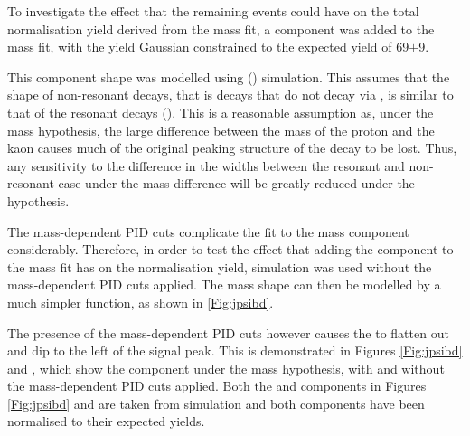 To investigate the effect that the remaining \Bd\to\jpsi\Kp\pim events could have on the total normalisation yield derived from the \Lbpijpsi mass fit, a \Bd\to\jpsi\Kp\pim component was added to the \Lbpijpsi mass fit, with the \Bd\to\jpsi\Kp\pim yield Gaussian constrained to the expected yield of 69$\pm$9.

This \Bd\to\jpsi\Kp\pim component shape was modelled using \Bd\to\jpsi\Kstarz(\to\Kp\pim) simulation. This assumes that the shape of non-resonant decays, that is \Bd\to\jpsi\Kp\pim decays that do not decay via \Kstarz, is similar to that of the resonant decays \Bd\to\jpsi\Kstarz(\to\Kp\pim). This is a reasonable assumption as, under the \jpsi\proton\pim mass hypothesis, the large difference between the mass of the proton and the kaon causes much of the original peaking structure of the decay to be lost. Thus, any sensitivity to the difference in the widths between the resonant and non-resonant case under the \jpsi\Kp\pim mass difference will be greatly reduced under the \jpsi\proton\pim hypothesis.

The mass-dependent PID cuts complicate the fit to the \BdToJPsiKst mass component considerably. Therefore, in order to test the effect that adding the \BdToJPsiKst component to the \Lbpijpsi mass fit has on the normalisation yield, simulation was used without the mass-dependent PID cuts applied. The mass shape can then be modelled by a much simpler function, as shown in \autoref{Fig:jpsibd}\protect{}.


The presence of the mass-dependent PID cuts however causes the \BdToJPsiKst to flatten out and dip to the left of the \Lbpijpsi signal peak. This is demonstrated in Figures \ref{Fig:jpsibd}\protect{} and \protect{}, which show the \BdToJPsiKst component under the \Lbpijpsi mass hypothesis, with and without the mass-dependent PID cuts applied. Both the \Lbpijpsi and \BdToJPsiKst components in Figures \ref{Fig:jpsibd}\protect{} and \protect{} are taken from simulation and both components have been normalised to their expected yields.


